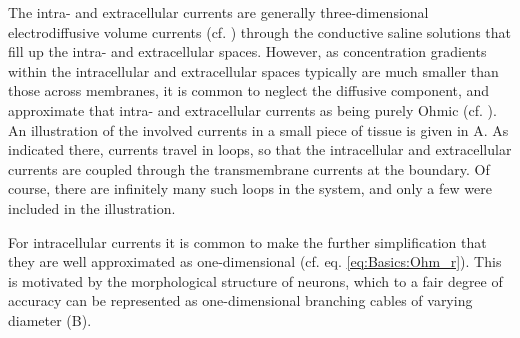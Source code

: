 The intra- and extracellular currents are generally three-dimensional electrodiffusive volume currents (cf. ) through the conductive saline solutions that fill up the intra- and extracellular spaces. However, as concentration gradients within the intracellular and extracellular spaces typically are much smaller than those across membranes, it is common to neglect the diffusive component, and approximate that intra- and extracellular currents as being purely Ohmic (cf. ). An illustration of the involved currents in a small piece of tissue is given in A. As indicated there, currents travel in loops, so that the intracellular and extracellular currents are coupled through the transmembrane currents at the boundary. Of course, there are infinitely many such loops in the system, and only a few were included in the illustration. 

For intracellular currents it is common to make the further simplification that they are well approximated as one-dimensional (cf. eq. \ref{eq:Basics:Ohm_r}). This is motivated by the morphological structure of neurons, which to a fair degree of accuracy can be represented as one-dimensional branching cables of varying diameter (B). 

